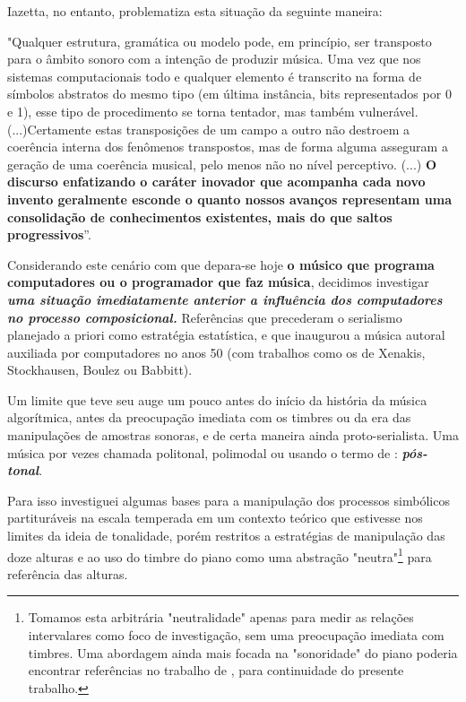 \documentclass[
	12pt,				%
	openright,			%
	twoside,			%
	a4paper,			%
	english,			%
	french,				%
	spanish,			%
	brazil				%
	]{abntex2}
\begin{document}
Iazetta, no entanto, problematiza esta situação da seguinte maneira:


\begin{citacao}
"Qualquer estrutura, gramática ou modelo pode, em princípio, ser transposto para o âmbito sonoro com a intenção de produzir música. Uma vez que nos sistemas computacionais todo e qualquer elemento é transcrito na forma de símbolos abstratos do mesmo tipo (em última instância, bits representados por 0 e 1), esse tipo de procedimento se torna tentador, mas também vulnerável.(...)Certamente estas transposições de um campo a outro não destroem a coerência interna dos fenômenos transpostos, mas de forma alguma asseguram a  geração de uma coerência musical, pelo menos não no nível perceptivo.
(...)
\textbf{O discurso enfatizando o caráter inovador que acompanha cada novo invento geralmente esconde o quanto nossos avanços representam uma consolidação  de conhecimentos existentes, mais do que saltos progressivos}”. \cite[p. 151-153, grifo nosso.]{iazzetta2009musica}
\end{citacao}

Considerando este cenário com que depara-se hoje \textbf{o músico que programa computadores ou o programador que faz música}, decidimos investigar \textit{\textbf{uma situação imediatamente anterior a influência dos computadores no processo composicional.}} Referências que precederam o serialismo planejado a priori como estratégia estatística, e que inaugurou a música autoral auxiliada por computadores no anos 50 (com trabalhos como os de Xenakis, Stockhausen, Boulez ou Babbitt).

Um limite que teve seu auge um pouco antes do início da história da música algorítmica, antes da preocupação imediata com os timbres ou da era das manipulações de amostras sonoras, e de certa maneira ainda proto-serialista. Uma música por vezes chamada politonal, polimodal ou usando o termo de : \textit{\textbf{pós-tonal}}. 

Para isso investiguei algumas bases para a manipulação dos processos simbólicos partituráveis na escala temperada em um contexto teórico que estivesse nos limites da ideia de tonalidade, porém restritos a estratégias de manipulação das doze alturas e ao uso do timbre do piano como uma abstração "neutra"\footnote{Tomamos esta arbitrária "neutralidade" apenas para medir as relações intervalares como foco de investigação, sem uma preocupação imediata com timbres. Uma abordagem ainda mais focada na "sonoridade" do piano poderia encontrar referências no trabalho de , para continuidade do presente trabalho. } para referência das alturas.
\end{document}
